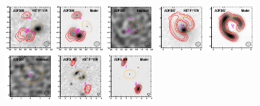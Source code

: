 \documentclass[iop]{emulateapj}
\begin{document}
\begin{figure}[!tbp]
\begin{centering}
\includegraphics[width=0.162\textwidth]{../Figures/modelfit/ADFS06_optical_bestfit.pdf}
\includegraphics[width=0.162\textwidth]{../Figures/modelfit/ADFS06_model_bestfit.pdf}
\includegraphics[width=0.162\textwidth]{../Figures/modelfit/ADFS06_residual_bestfit.pdf}
\includegraphics[width=0.162\textwidth]{../Figures/modelfit/ADFS07_optical_bestfit.pdf}
\includegraphics[width=0.162\textwidth]{../Figures/modelfit/ADFS07_model_bestfit.pdf}
\includegraphics[width=0.162\textwidth]{../Figures/modelfit/ADFS07_residual_bestfit.pdf}
\includegraphics[width=0.162\textwidth]{../Figures/modelfit/ADFS_M0_optical_bestfit.pdf}
\includegraphics[width=0.162\textwidth]{../Figures/modelfit/ADFS_M0_model_bestfit.pdf}

\end{centering}
\end{figure}
\end{document}
